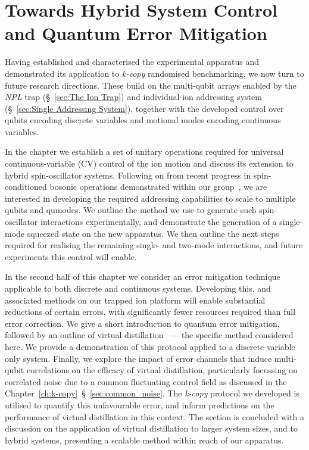\chapter{Towards Hybrid System Control and Quantum Error Mitigation}
\label{ch:QEM}
\minitoc

Having established and characterised the experimental apparatus and demonstrated its application to \emph{k-copy} randomised benchmarking, we now turn to future research directions. These build on the multi-qubit arrays enabled by the \emph{NPL} trap (\S~\ref{sec:The Ion Trap}) and individual-ion addressing system (\S~\ref{sec:Single Addressing System}), together with the developed control over qubits encoding discrete variables and motional modes encoding continuous variables.

In the chapter we establish a set of unitary operations required for
universal continuous-variable (CV)
control of the ion motion and discuss its extension to hybrid spin-oscillator
systems.
Following on from recent
progress in spin-conditioned bosonic operations demonstrated within our
group~\cite{bazavan_squeezing_2026,saner_generating_2026, bazavan_easy_2024,
saner_quantum_2026, shinbrough_applications_2026, saner_aharonovbohm_2026}, we are interested in developing the
required addressing capabilities to scale to multiple qubits and qumodes. 
We outline the method we use to generate such spin-oscillator
interactions experimentally, and demonstrate the generation of a single-mode squeezed state
on the new apparatus. We then outline the next steps required for realising
the remaining single- and two-mode interactions, and future experiments
this control will enable. 

In the second half of this chapter we consider an error mitigation technique
applicable to both discrete and continuous systems. Developing this, and
associated methods on our trapped ion platform will enable substantial reductions
of certain errors, with significantly fewer resources required than full error
correction. We give a short introduction to quantum error
mitigation, followed by an outline of virtual
distillation~\cite{cotler_quantum_2019,koczor_exponential_2021,huggins_virtual_2021}
--- the specific method considered here.
 We provide a demonstration
of this protocol applied to a discrete-variable only system. Finally, we explore the
impact of error channels that induce multi-qubit correlations on the efficacy of virtual distillation,
particularly focussing on correlated noise due to a common
fluctuating control field as discussed in the
Chapter~\ref{ch:k-copy}~\S~\ref{sec:common_noise}. The \emph{k-copy}
protocol we developed is utilised to quantify this unfavourable error, and inform
predictions on the performance of virtual distillation in this context. The section is concluded with a discussion on the application of virtual
distillation to larger system sizes, and to hybrid systems, presenting a scalable method within reach of our
apparatus.

